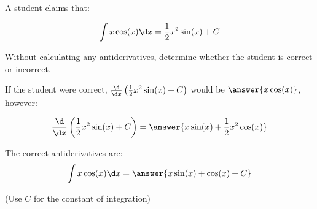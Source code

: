 \documentclass{ximera}
\author{Jim Talamo}
\begin{document}
\begin{exercise}
A student claims that:

\[
\int x \cos(x) \d x = \frac{1}{2} x^2 \sin(x) +C
\]

Without calculating any antiderivatives, determine whether the student is correct or incorrect. 

\begin{multipleChoice}
\end{multipleChoice}

If the student were correct, $\frac{\d}{\d x} \left(\frac{1}{2} x^2 \sin(x) +C\right)$ would be $\answer{x \cos(x)}$, however:


\[
\frac{\d}{\d x} \left(\frac{1}{2} x^2 \sin(x) +C\right) = \answer{x \sin(x)+\frac{1}{2}x^2 \cos(x)}
\]

\begin{exercise}
The correct antiderivatives are:
\[
\int x \cos(x) \d x = \answer{x \sin(x)+\cos(x) +C}
\]

(Use $C$ for the constant of integration)

\end{exercise}
\end{exercise}
\end{document}
